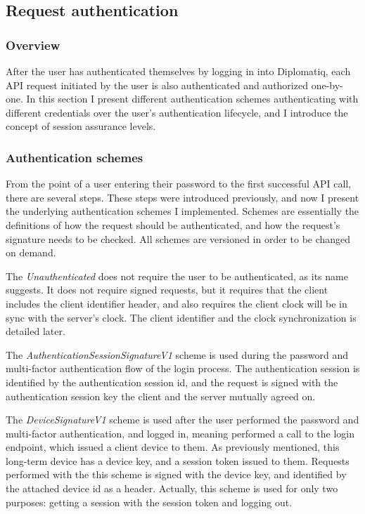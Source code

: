 \subsection{Request authentication}

\subsubsection{Overview}

After the user has authenticated themselves by logging in into Diplomatiq, each API request initiated by the user is also authenticated and authorized one-by-one. In this section I present different authentication schemes authenticating with different credentials over the user's authentication lifecycle, and I introduce the concept of session assurance levels.

\subsubsection{Authentication schemes}

From the point of a user entering their password to the first successful  API call, there are several steps. These steps were introduced previously, and now I present the underlying authentication schemes I implemented. Schemes are essentially the definitions of how the request should be authenticated, and how the request's signature needs to be checked. All schemes are versioned in order to be changed on demand.

The \emph{Unauthenticated}  does not require the user to be authenticated, as its name suggests. It does not require signed requests, but it requires that the client includes the client identifier header, and also requires the client clock will be in sync with the server's clock. The client identifier and the clock synchronization is detailed later.

The \emph{AuthenticationSessionSignatureV1} scheme is used during the password and multi-factor authentication flow of the login process. The authentication session is identified by the authentication session id, and the request is signed with the authentication session key the client and the server mutually agreed on.

The \emph{DeviceSignatureV1} scheme is used after the user performed the password and multi-factor authentication, and logged in, meaning performed a call to the login endpoint, which issued a client device to them. As previously mentioned, this long-term device has a device key, and a session token issued to them. Requests performed with the this scheme is signed with the device key, and identified by the attached device id as a header. Actually, this scheme is used for only two purposes: getting a session with the session token and logging out.

